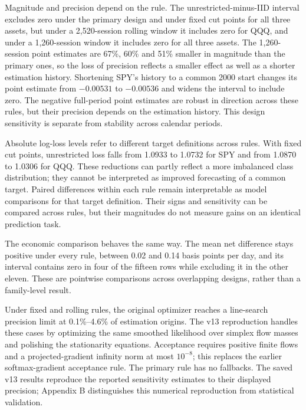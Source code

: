 Magnitude and precision depend on the rule. The unrestricted-minus-IID interval excludes zero under the primary design and under fixed cut points for all three assets, but under a 2,520-session rolling window it includes zero for QQQ, and under a 1,260-session window it includes zero for all three assets. The 1,260-session point estimates are 67\%, 60\% and 51\% smaller in magnitude than the primary ones, so the loss of precision reflects a smaller effect as well as a shorter estimation history. Shortening SPY's history to a common 2000 start changes its point estimate from $-0.00531$ to $-0.00536$ and widens the interval to include zero. The negative full-period point estimates are robust in direction across these rules, but their precision depends on the estimation history. This design sensitivity is separate from stability across calendar periods.

Absolute log-loss levels refer to different target definitions across rules. With fixed cut points, unrestricted loss falls from 1.0933 to 1.0732 for SPY and from 1.0870 to 1.0306 for QQQ. These reductions can partly reflect a more imbalanced class distribution; they cannot be interpreted as improved forecasting of a common target. Paired differences within each rule remain interpretable as model comparisons for that target definition. Their signs and sensitivity can be compared across rules, but their magnitudes do not measure gains on an identical prediction task.

The economic comparison behaves the same way. The mean net difference stays positive under every rule, between 0.02 and 0.14 basis points per day, and its interval contains zero in four of the fifteen rows while excluding it in the other eleven. These are pointwise comparisons across overlapping designs, rather than a family-level result.

Under fixed and rolling rules, the original optimizer reaches a line-search precision limit at 0.1\%--4.6\% of estimation origins. The v13 reproduction handles these cases by optimizing the same smoothed likelihood over simplex flow masses and polishing the stationarity equations. Acceptance requires positive finite flows and a projected-gradient infinity norm at most $10^{-8}$; this replaces the earlier softmax-gradient acceptance rule. The primary rule has no fallbacks. The saved v13 results reproduce the reported sensitivity estimates to their displayed precision; Appendix B distinguishes this numerical reproduction from statistical validation.

